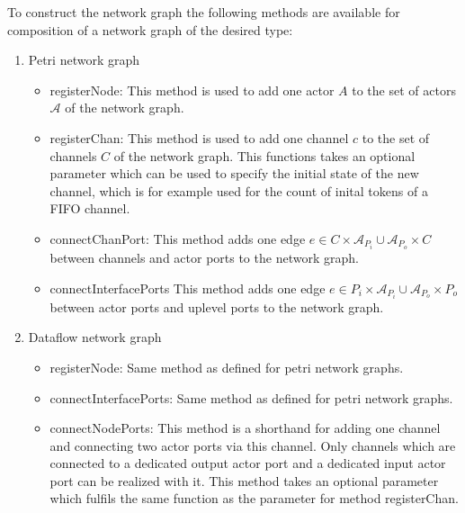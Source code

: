 To construct the network graph the following methods are available for
composition of a network graph of the desired type:
\begin{enumerate}
\item Petri network graph

  \begin{itemize}
  \item registerNode:
    This method is used to add one actor $A$ to the set of actors $\mathcal{A}$
    of the network graph.

  \item registerChan:
    This method is used to add one channel $c$ to the set of channels $C$
    of the network graph. This functions takes an optional parameter which can
    be used to specify the initial state of the new channel, which is
    for example used for the count of inital tokens of a FIFO channel.

  \item connectChanPort:
    This method adds one edge $e \in C \times \mathcal{A}_{P_{i}} \cup \mathcal{A}_{P_{o}} \times C$
    between channels and actor ports to the network graph.

  \item connectInterfacePorts
    This method adds one edge $e \in P_{i} \times \mathcal{A}_{P_{i}} \cup \mathcal{A}_{P_{o}} \times P_{o}$
    between actor ports and uplevel ports to the network graph.

  \end{itemize}

\item Dataflow network graph

  \begin{itemize}
  \item registerNode: Same method as defined for petri network graphs.
  
  \item connectInterfacePorts: Same method as defined for petri network graphs.
  
  \item connectNodePorts:
    This method is a shorthand for adding one channel and
    connecting two actor ports via this channel. Only channels
    which are connected to a dedicated output actor port and
    a dedicated input actor port can be realized with it.
    This method takes an optional parameter which fulfils
    the same function as the parameter for method registerChan.
  
  \end{itemize}

\end{enumerate}

